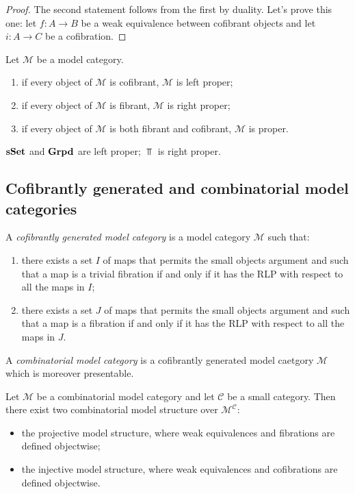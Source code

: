 \begin{refsection}
\begin{proof}
The second statement follows from the first by duality. Let's prove this one: let $f \colon A \to B$ be a weak equivalence between cofibrant objects and let $i \colon A \to C$ be a cofibration.
\end{proof}

\begin{cor}
Let $\mathcal M$ be a model category.
\begin{enumerate}
\item if every object of $\mathcal M$ is cofibrant, $\mathcal M$ is left proper;
\item if every object of $\mathcal M$ is fibrant, $\mathcal M$ is right proper;
\item if every object of $\mathcal M$ is both fibrant and cofibrant, $\mathcal M$ is proper.
\end{enumerate}
\end{cor}

\begin{cor}
$\mathbf{s\,\!\mathbf{Set}}$ and $\mathbf{Grpd}$ are left proper; $\Top$ is right proper.
\end{cor}

\subsection{Cofibrantly generated and combinatorial model categories}

\begin{defin}
A \emph{cofibrantly generated model category} is a model category $\mathcal M$ such that:
\begin{enumerate}
\item there exists a set $I$ of maps that permits the small objects argument and such that a map is a trivial fibration if and only if it has the RLP with respect to all the maps in $I$;
\item there exists a set $J$ of maps that permits the small objects argument and such that a map is a fibration if and only if it has the RLP with respect to all the maps in $J$.
\end{enumerate}
\end{defin}

\begin{defin} \label{def combinatorial}
A \emph{combinatorial model category} is a cofibrantly generated model caetgory $\mathcal M$ which is moreover presentable.
\end{defin}

\begin{thm} \label{thm combinatorial functor cat}
Let $\mathcal M$ be a combinatorial model category and let $\mathcal C$ be a small category. Then there exist two combinatorial model structure over $\mathcal M^{\mathcal C}$:
\begin{itemize}
\item the projective model structure, where weak equivalences and fibrations are defined objectwise;
\item the injective model structure, where weak equivalences and cofibrations are defined objectwise.
\end{itemize}
\end{thm}


\end{refsection}
